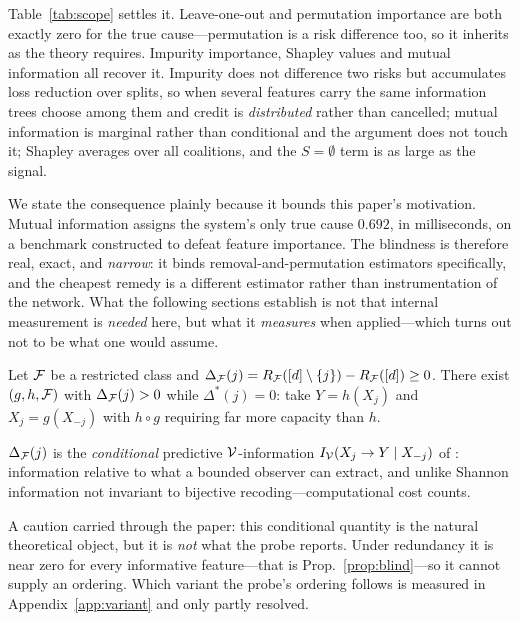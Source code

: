 Table~\ref{tab:scope} settles it. Leave-one-out and permutation importance are
both exactly zero for the true cause---permutation is a risk difference too, so
it inherits as the theory requires. Impurity importance, Shapley values and
mutual information all recover it. Impurity does not difference two risks but
accumulates loss reduction over splits, so when several features carry the same
information trees choose among them and credit is \emph{distributed} rather than
cancelled; mutual information is marginal rather than conditional and the
argument does not touch it; Shapley averages over all coalitions, and the
$S = \emptyset$ term is as large as the signal.

We state the consequence plainly because it bounds this paper's motivation.
Mutual information assigns the system's only true cause $0.692$, in
milliseconds, on a benchmark constructed to defeat feature importance. The
blindness is therefore real, exact, and \emph{narrow}: it binds
removal-and-permutation estimators specifically, and the cheapest remedy is a
different estimator rather than instrumentation of the network. What the
following sections establish is not that internal measurement is \emph{needed}
here, but what it \emph{measures} when applied---which turns out not to be what
one would assume.

\begin{proposition}\label{prop:capacity}
Let $\mathcal{F}$ be a restricted class and
$\Delta_{\mathcal{F}}(j) = R_{\mathcal{F}}([d]\setminus\{j\}) - R_{\mathcal{F}}([d]) \ge 0$.
There exist $(g,h,\mathcal{F})$ with $\Delta_{\mathcal{F}}(j) > 0$ while
$\Delta^*(j) = 0$: take $Y = h(X_j)$ and $X_j = g(X_{-j})$ with $h \circ g$
requiring far more capacity than $h$.
\end{proposition}

$\Delta_{\mathcal{F}}(j)$ is the \emph{conditional} predictive $\mathcal{V}$-information
$I_{\mathcal{V}}(X_j \to Y \mid X_{-j})$ of \citet{xu2020theory}: information relative
to what a bounded observer can extract, and unlike Shannon information not
invariant to bijective recoding---computational cost counts.

A caution carried through the paper: this conditional quantity is the natural
theoretical object, but it is \emph{not} what the probe reports. Under
redundancy it is near zero for every informative feature---that is
Prop.~\ref{prop:blind}---so it cannot supply an ordering. Which variant the
probe's ordering follows is measured in Appendix~\ref{app:variant} and only
partly resolved.

